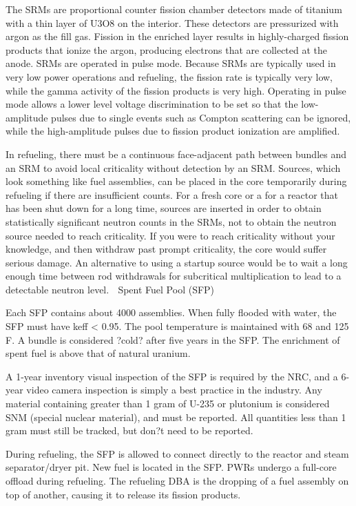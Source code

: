 \documentclass[10pt]{article}
\begin{document}
The SRMs are proportional counter fission chamber detectors made of titanium with a thin layer of U3O8 on the interior. These detectors are pressurized with argon as the fill gas. Fission in the enriched layer results in highly-charged fission products that ionize the argon, producing electrons that are collected at the anode. SRMs are operated in pulse mode. Because SRMs are typically used in very low power operations and refueling, the fission rate is typically very low, while the gamma activity of the fission products is very high. Operating in pulse mode allows a lower level voltage discrimination to be set so that the low-amplitude pulses due to single events such as Compton scattering can be ignored, while the high-amplitude pulses due to fission product ionization are amplified.  

In refueling, there must be a continuous face-adjacent path between bundles and an SRM to avoid local criticality without detection by an SRM. Sources, which look something like fuel assemblies, can be placed in the core temporarily during refueling if there are insufficient counts. For a fresh core or a for a reactor that has been shut down for a long time, sources are inserted in order to obtain statistically significant neutron counts in the SRMs, not to obtain the neutron source needed to reach criticality. If you were to reach criticality without your knowledge, and then withdraw past prompt criticality, the core would suffer serious damage. An alternative to using a startup source would be to wait a long enough time between rod withdrawals for subcritical multiplication to lead to a detectable neutron level. 

Spent Fuel Pool (SFP)

Each SFP contains about 4000 assemblies. When fully flooded with water, the SFP must have keff < 0.95.  The pool temperature is maintained with 68 and 125 F. A bundle is considered ?cold? after five years in the SFP. The enrichment of spent fuel is above that of natural uranium. 

A 1-year inventory visual inspection of the SFP is required by the NRC, and a 6-year video camera inspection is simply a best practice in the industry. Any material containing greater than 1 gram of U-235 or plutonium is considered SNM (special nuclear material), and must be reported. All quantities less than 1 gram must still be tracked, but don?t need to be reported. 

During refueling, the SFP is allowed to connect directly to the reactor and steam separator/dryer pit. New fuel is located in the SFP. PWRs undergo a full-core offload during refueling. The refueling DBA is the dropping of a fuel assembly on top of another, causing it to release its fission products. 
\end{document}
